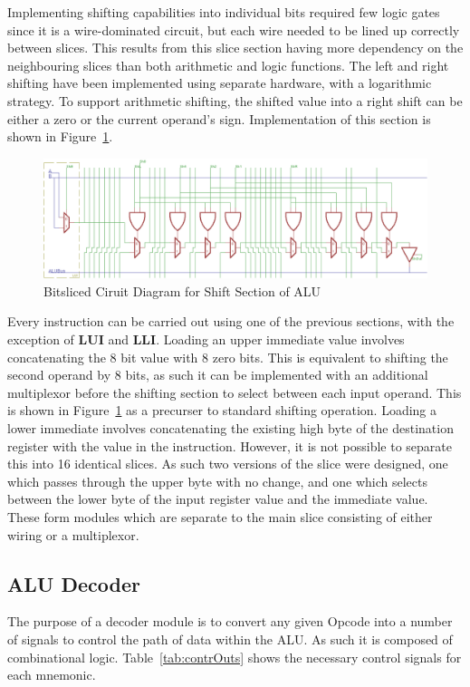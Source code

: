 Implementing shifting capabilities into individual bits required few logic gates since it is a wire-dominated circuit, but each wire needed to be lined up correctly between slices. 
This results from this slice section having more dependency on the neighbouring slices than both arithmetic and logic functions. 
The left and right shifting have been implemented using separate hardware, with a logarithmic strategy. 
To support arithmetic shifting, the shifted value into a right shift can be either a zero or the current operand's sign.
Implementation of this section is shown in Figure~\ref{fig:ShiftSlice}. 


\begin{figure}[h]
	\centering
	\includegraphics[scale=0.75]{Figures/ShiftSlice.png}
	\caption{Bitsliced Ciruit Diagram for Shift Section of ALU}
	\label{fig:ShiftSlice}
\end{figure}

Every instruction can be carried out using one of the previous sections, with the exception of \textbf{LUI} and \textbf{LLI}. 
Loading an upper immediate value involves concatenating the 8 bit value with 8 zero bits. 
This is equivalent to shifting the second operand by 8 bits, as such it can be implemented with an additional multiplexor before the shifting section to select between each input operand. 
This is shown in Figure~\ref{fig:ShiftSlice} as a precurser to standard shifting operation. 
Loading a lower immediate involves concatenating the existing high byte of the destination register with the value in the instruction. 
However, it is not possible to separate this into 16 identical slices. 
As such two versions of the slice were designed, one which passes through the upper byte with no change, and one which selects between the lower byte of the input register value and the immediate value. 
These form modules which are separate to the main slice consisting of either wiring or a multiplexor.

\subsection{ALU Decoder}
The purpose of a decoder module is to convert any given Opcode into a number of signals to control the path of data within the ALU. 
As such it is composed of combinational logic. 
Table~\ref{tab:contrOuts} shows the necessary control signals for each mnemonic.

